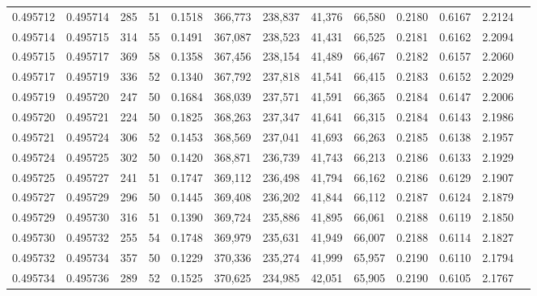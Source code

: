 \begin{tabular}{rrrrrrrrrrrrr}
0.495712 & 0.495714 &   285 &  51 &                                     0.1518 & 366,773 & 238,837 &  41,376 &  66,580 & 0.2180 & 0.6167 & 2.2124 \\
0.495714 & 0.495715 &   314 &  55 &                                     0.1491 & 367,087 & 238,523 &  41,431 &  66,525 & 0.2181 & 0.6162 & 2.2094 \\
0.495715 & 0.495717 &   369 &  58 &                                     0.1358 & 367,456 & 238,154 &  41,489 &  66,467 & 0.2182 & 0.6157 & 2.2060 \\
0.495717 & 0.495719 &   336 &  52 &                                     0.1340 & 367,792 & 237,818 &  41,541 &  66,415 & 0.2183 & 0.6152 & 2.2029 \\
0.495719 & 0.495720 &   247 &  50 &                                     0.1684 & 368,039 & 237,571 &  41,591 &  66,365 & 0.2184 & 0.6147 & 2.2006 \\
0.495720 & 0.495721 &   224 &  50 &                                     0.1825 & 368,263 & 237,347 &  41,641 &  66,315 & 0.2184 & 0.6143 & 2.1986 \\
0.495721 & 0.495724 &   306 &  52 &                                     0.1453 & 368,569 & 237,041 &  41,693 &  66,263 & 0.2185 & 0.6138 & 2.1957 \\
0.495724 & 0.495725 &   302 &  50 &                                     0.1420 & 368,871 & 236,739 &  41,743 &  66,213 & 0.2186 & 0.6133 & 2.1929 \\
0.495725 & 0.495727 &   241 &  51 &                                     0.1747 & 369,112 & 236,498 &  41,794 &  66,162 & 0.2186 & 0.6129 & 2.1907 \\
0.495727 & 0.495729 &   296 &  50 &                                     0.1445 & 369,408 & 236,202 &  41,844 &  66,112 & 0.2187 & 0.6124 & 2.1879 \\
0.495729 & 0.495730 &   316 &  51 &                                     0.1390 & 369,724 & 235,886 &  41,895 &  66,061 & 0.2188 & 0.6119 & 2.1850 \\
0.495730 & 0.495732 &   255 &  54 &                                     0.1748 & 369,979 & 235,631 &  41,949 &  66,007 & 0.2188 & 0.6114 & 2.1827 \\
0.495732 & 0.495734 &   357 &  50 &                                     0.1229 & 370,336 & 235,274 &  41,999 &  65,957 & 0.2190 & 0.6110 & 2.1794 \\
0.495734 & 0.495736 &   289 &  52 &                                     0.1525 & 370,625 & 234,985 &  42,051 &  65,905 & 0.2190 & 0.6105 & 2.1767 \\

\end{tabular}
